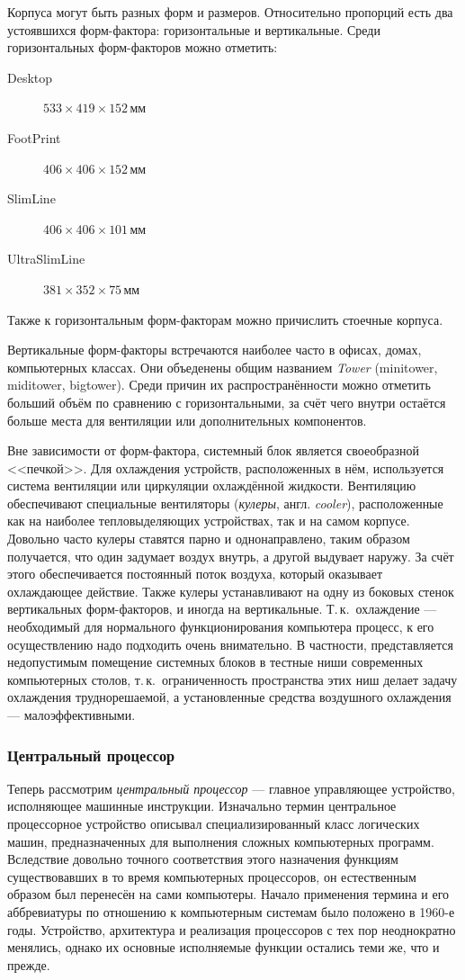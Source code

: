 Корпуса могут быть разных форм и размеров. Относительно пропорций есть два устоявшихся форм-фактора: горизонтальные и вертикальные. Среди горизонтальных форм-факторов можно отметить:
\begin{description}
 \item[Desktop] $533\times419\times152$\,мм
 \item[FootPrint] $406\times406\times152$\,мм
 \item[SlimLine] $406\times406\times101$\,мм
 \item[UltraSlimLine] $381\times352\times75$\,мм
\end{description}
Также к горизонтальным форм-факторам можно причислить стоечные корпуса.

Вертикальные форм-факторы встречаются наиболее часто в офисах, домах, компьютерных классах. Они объеденены общим названием \emph{Tower} (minitower, miditower, bigtower). Среди причин их распространённости можно отметить больший объём по сравнению с горизонтальными, за счёт чего внутри остаётся больше места для вентиляции или дополнительных компонентов.

Вне зависимости от форм-фактора, системный блок является своеобразной <<печкой>>. Для охлаждения устройств, расположенных в нём, используется система вентиляции или циркуляции охлаждённой жидкости. Вентиляцию обеспечивают специальные вентиляторы (\emph{кулеры}, англ. \emph{cooler}), расположенные как на наиболее тепловыделяющих уст\-ройствах, так и на самом корпусе.
Довольно часто кулеры ставятся парно и однонаправлено, таким образом получается, что один задумает воздух внутрь, а другой выдувает наружу. За счёт этого обеспечивается постоянный поток воздуха, который оказывает охлаждающее действие.
Также кулеры устанавливают на одну из боковых стенок вертикальных форм-факторов, и иногда на вертикальные. Т.\,к.~охлаждение --- необходимый для нормального функционирования компьютера процесс, к его осуществлению надо подходить очень внимательно.
В частности, представляется недопустимым помещение системных блоков в тестные ниши современных компьютерных столов, т.\,к.~ограниченность пространства этих ниш делает задачу охлаждения труднорешаемой, а установленные средства воздушного охлаждения --- малоэффективными.

\subsubsection{Центральный процессор}\label{base:introduction:components:cpu}
Теперь рассмотрим \emph{центральный процессор} --- главное управляющее устройство, исполняющее машинные инструкции.
Изначально термин центральное процессорное устройство описывал специализированный класс логических машин, предназначенных для выполнения сложных компьютерных программ.
Вследствие довольно точного соответствия этого назначения функциям существовавших в то время компьютерных процессоров, он естественным образом был перенесён на сами компьютеры.
Начало применения термина и его аббревиатуры по отношению к компьютерным системам было положено в 1960-е годы.
Устройство, архитектура и реализация процессоров с тех пор неоднократно менялись, однако их основные исполняемые функции остались теми же, что и прежде.

